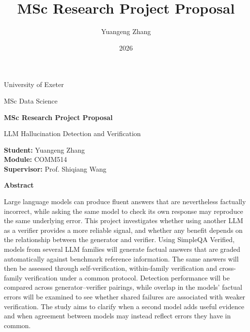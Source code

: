 \documentclass[11pt,a4paper]{article}
\title{MSc Research Project Proposal}
\author{Yuangeng Zhang}
\date{2026}
\begin{document}
	
	
	\begin{titlepage}
		
		\centering
		
		{\large University of Exeter\par}
		\vspace{0.25cm}
		
		{\large MSc Data Science\par}
		\vspace{0.8cm}
		
		{\LARGE\bfseries MSc Research Project Proposal\par}
		\vspace{0.45cm}
		
		{\large LLM Hallucination Detection and Verification\par}
		
		\vspace{0.8cm}
		
		\begin{flushleft}
			\textbf{Student:} Yuangeng Zhang\\
			\textbf{Module:} COMM514\\
			\textbf{Supervisor:} Prof. Shiqiang Wang
		\end{flushleft}
		
		\vspace{0.7cm}
		
		\begin{flushleft}
			\textbf{Abstract}
			
			\vspace{0.2cm}
			
			Large language models can produce fluent answers that are nevertheless
			factually incorrect, while asking the same model to check its own response
			may reproduce the same underlying error. This project investigates whether
			using another LLM as a verifier provides a more reliable signal, and whether
			any benefit depends on the relationship between the generator and verifier.
			Using SimpleQA Verified, models from several LLM families will generate
			factual answers that are graded automatically against benchmark reference
			information. The same answers will then be assessed through self-verification,
			within-family verification and cross-family verification under a common
			protocol. Detection performance will be compared across generator--verifier
			pairings, while overlap in the models' factual errors will be examined to
			see whether shared failures are associated with weaker verification. The
			study aims to clarify when a second model adds useful evidence and when
			agreement between models may instead reflect errors they have in common.
		\end{flushleft}
		

\end{titlepage}
\end{document}
